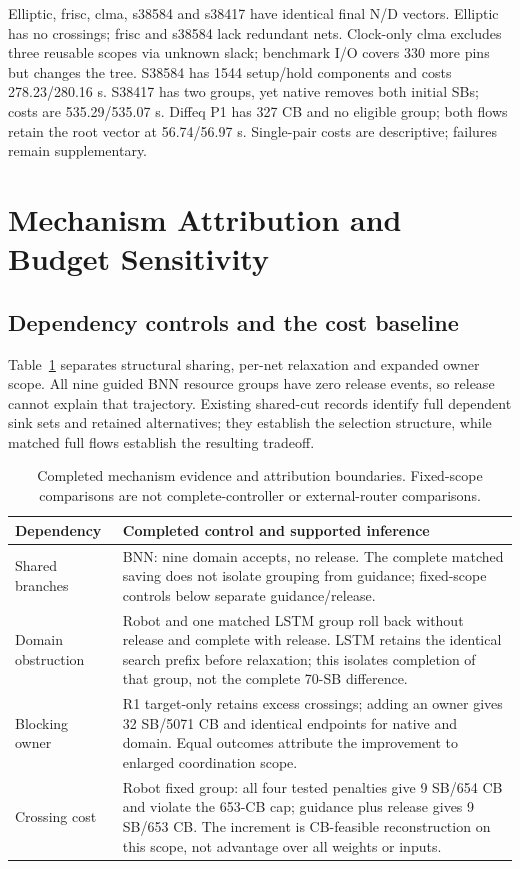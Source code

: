 \documentclass[conference,10pt]{IEEEtran}
\begin{document}
Elliptic, frisc, clma, s38584 and s38417 have identical final N/D vectors. Elliptic has no crossings; frisc and s38584 lack redundant nets. Clock-only clma excludes three reusable scopes via unknown slack; benchmark I/O covers 330 more pins but changes the tree. S38584 has 1544 setup/hold components and costs 278.23/280.16 s. S38417 has two groups, yet native removes both initial SBs; costs are 535.29/535.07 s. Diffeq P1 has 327 CB and no eligible group; both flows retain the root vector at 56.74/56.97 s. Single-pair costs are descriptive; failures remain supplementary.

\section{Mechanism Attribution and Budget Sensitivity}
\subsection{Dependency controls and the cost baseline}
Table~\ref{tab:attribution} separates structural sharing, per-net relaxation and expanded owner scope. All nine guided BNN resource groups have zero release events, so release cannot explain that trajectory. Existing shared-cut records identify full dependent sink sets and retained alternatives; they establish the selection structure, while matched full flows establish the resulting tradeoff.

\begin{table}[t]
\centering\footnotesize\setlength{\tabcolsep}{3pt}
\caption{Completed mechanism evidence and attribution boundaries. Fixed-scope comparisons are not complete-controller or external-router comparisons.}
\label{tab:attribution}
\begin{tabular}{p{}p{}}\hline
Dependency & Completed control and supported inference\\\hline
Shared branches & BNN: nine domain accepts, no release. The complete matched saving does not isolate grouping from guidance; fixed-scope controls below separate guidance/release.\\
Domain obstruction & Robot and one matched LSTM group roll back without release and complete with release. LSTM retains the identical search prefix before relaxation; this isolates completion of that group, not the complete 70-SB difference.\\
Blocking owner & R1 target-only retains excess crossings; adding an owner gives 32 SB/5071 CB and identical endpoints for native and domain. Equal outcomes attribute the improvement to enlarged coordination scope.\\
Crossing cost & Robot fixed group: all four tested penalties give 9 SB/654 CB and violate the 653-CB cap; guidance plus release gives 9 SB/653 CB. The increment is CB-feasible reconstruction on this scope, not advantage over all weights or inputs.\\\hline
\end{tabular}
\end{table}
\end{document}
